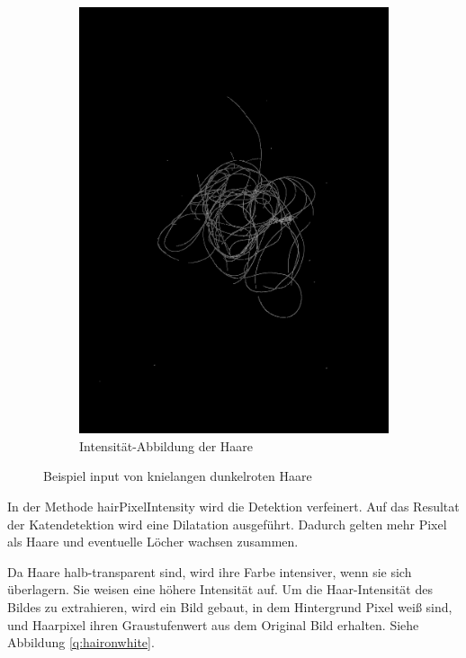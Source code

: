 \documentclass[german,a4paper,12pt,smallheadings,headsepline, titlepage, liststotoc, idextotoc,bibtoctoc,blibliography = totocnumbered]{scrartcl}
\begin{document}
\begin{figure}
\begin{subfigure}[b]{0.475\textwidth}
		\includegraphics[width=\textwidth]{fig64/05intenstiy.png}
		\caption[]{Intensität-Abbildung der Haare}
		\label{img:Intensity}
	\end{subfigure}
	\caption[  ]
	{\small Beispiel input von knielangen dunkelroten Haare} 
	\label{img:tstM}
\end{figure}


In der Methode hairPixelIntensity wird die Detektion verfeinert.
Auf das Resultat der Katendetektion wird eine Dilatation ausgeführt. Dadurch gelten mehr Pixel als Haare und eventuelle Löcher wachsen zusammen.

Da Haare halb-transparent sind, wird ihre Farbe intensiver, wenn sie sich überlagern. Sie weisen eine höhere Intensität auf.
Um die Haar-Intensität des Bildes zu extrahieren, wird ein Bild gebaut, in dem Hintergrund Pixel weiß sind, und Haarpixel ihren Graustufenwert aus dem Original Bild erhalten. Siehe Abbildung \ref{q:haironwhite}.
\end{document}
